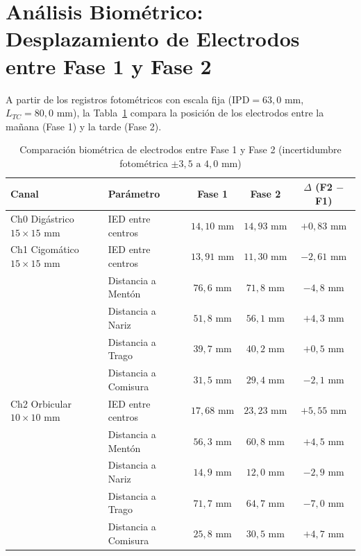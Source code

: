 \documentclass[11pt,a4paper]{article}
\begin{document}
\section{An\'alisis Biom\'etrico: Desplazamiento de Electrodos entre Fase 1 y Fase 2}

A partir de los registros fotom\'etricos con escala fija ($\text{IPD} = 63{,}0\text{ mm}$, $L_{TC} = 80{,}0\text{ mm}$), la Tabla~\ref{tab:biometria} compara la posici\'on de los electrodos entre la ma\~nana (Fase 1) y la tarde (Fase 2).

\begin{table}[h!]
\centering
\caption{Comparaci\'on biom\'etrica de electrodos entre Fase 1 y Fase 2 (incertidumbre fotom\'etrica $\pm 3{,}5\text{ a }4{,}0\text{ mm}$)}
\label{tab:biometria}
\small
\begin{tabular}{llccc}
\toprule
\textbf{Canal} & \textbf{Par\'ametro} & \textbf{Fase 1} & \textbf{Fase 2} & \textbf{$\Delta$ (F2 $-$ F1)} \\
\midrule
Ch0 Dig\'astrico $15\times 15\text{ mm}$ & IED entre centros & $14{,}10\text{ mm}$ & $14{,}93\text{ mm}$ & $+0{,}83\text{ mm}$ \\
\midrule
Ch1 Cigom\'atico $15\times 15\text{ mm}$ & IED entre centros & $13{,}91\text{ mm}$ & $11{,}30\text{ mm}$ & $-2{,}61\text{ mm}$ \\
& Distancia a Ment\'on & $76{,}6\text{ mm}$ & $71{,}8\text{ mm}$ & $-4{,}8\text{ mm}$ \\
& Distancia a Nariz & $51{,}8\text{ mm}$ & $56{,}1\text{ mm}$ & $+4{,}3\text{ mm}$ \\
& Distancia a Trago & $39{,}7\text{ mm}$ & $40{,}2\text{ mm}$ & $+0{,}5\text{ mm}$ \\
& Distancia a Comisura & $31{,}5\text{ mm}$ & $29{,}4\text{ mm}$ & $-2{,}1\text{ mm}$ \\
\midrule
Ch2 Orbicular $10\times 10\text{ mm}$ & IED entre centros & $17{,}68\text{ mm}$ & $23{,}23\text{ mm}$ & $+5{,}55\text{ mm}$ \\
& Distancia a Ment\'on & $56{,}3\text{ mm}$ & $60{,}8\text{ mm}$ & $+4{,}5\text{ mm}$ \\
& Distancia a Nariz & $14{,}9\text{ mm}$ & $12{,}0\text{ mm}$ & $-2{,}9\text{ mm}$ \\
& Distancia a Trago & $71{,}7\text{ mm}$ & $64{,}7\text{ mm}$ & $-7{,}0\text{ mm}$ \\
& Distancia a Comisura & $25{,}8\text{ mm}$ & $30{,}5\text{ mm}$ & $+4{,}7\text{ mm}$ \\
\bottomrule
\end{tabular}
\end{table}
\end{document}
